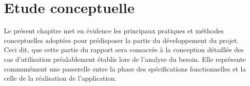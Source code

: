 \chapter{Etude conceptuelle}
Le présent chapitre met en évidence les principaux pratiques et méthodes conceptuelles adoptées pour prédisposer la partie du développement du projet. Ceci dit, que cette partie du rapport sera consacrée à la conception détaillée des cas d’utilisation préalablement établis lors de l’analyse du besoin. Elle représente communément une passerelle entre la phase des spécifications fonctionnelles et la celle de la réalisation de l’application.



